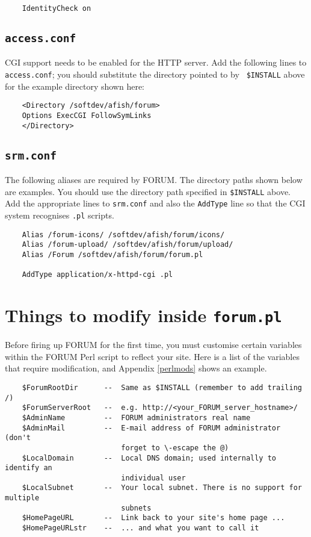 \begin{verbatim}
    IdentityCheck on
\end{verbatim}

\subsection{{\tt access.conf}}

CGI support needs to be enabled for the HTTP server. Add the following lines to
{\tt access.conf}; you should substitute the directory pointed to by {\tt
\$INSTALL} above for the example directory shown here:

\begin{verbatim}
    <Directory /softdev/afish/forum>
    Options ExecCGI FollowSymLinks
    </Directory>
\end{verbatim}


\subsection{{\tt srm.conf}}

The following aliases are required by FORUM. The directory paths shown below
are examples. You should use the directory path specified in {\tt \$INSTALL}
above. Add the appropriate lines to {\tt srm.conf} and also the {\tt AddType}
line so that the CGI system recognises {\tt .pl} scripts.

\begin{verbatim}
    Alias /forum-icons/ /softdev/afish/forum/icons/
    Alias /forum-upload/ /softdev/afish/forum/upload/
    Alias /Forum /softdev/afish/forum/forum.pl

    AddType application/x-httpd-cgi .pl
\end{verbatim}


\section{Things to modify inside {\tt forum.pl}}

Before firing up FORUM for the first time, you must customise certain variables
within the FORUM Perl script to reflect your site. Here is a list of the 
variables that require modification, and Appendix \ref{perlmods} shows an
example.

\begin{verbatim}
    $ForumRootDir      --  Same as $INSTALL (remember to add trailing /)
    $ForumServerRoot   --  e.g. http://<your_FORUM_server_hostname>/
    $AdminName         --  FORUM administrators real name
    $AdminMail         --  E-mail address of FORUM administrator (don't 
                           forget to \-escape the @)
    $LocalDomain       --  Local DNS domain; used internally to identify an
                           individual user
    $LocalSubnet       --  Your local subnet. There is no support for multiple
                           subnets
    $HomePageURL       --  Link back to your site's home page ...
    $HomePageURLstr    --  ... and what you want to call it
\end{verbatim}

